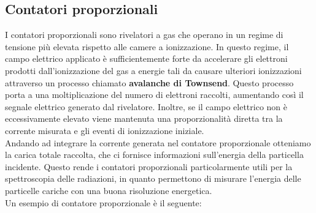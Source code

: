 \subsection{Contatori proporzionali}
I contatori proporzionali sono rivelatori a gas che operano in un regime di tensione più elevata rispetto alle camere a ionizzazione. In questo regime, il campo elettrico applicato è sufficientemente forte da accelerare gli elettroni prodotti dall'ionizzazione del gas a energie tali da causare ulteriori ionizzazioni attraverso un processo chiamato \textbf{avalanche di Townsend}. Questo processo porta a una moltiplicazione del numero di elettroni raccolti, aumentando così il segnale elettrico generato dal rivelatore. Inoltre, se il campo elettrico non è eccessivamente elevato viene mantenuta una proporzionalità diretta tra la corrente misurata e gli eventi di ionizzazione iniziale.\\
Andando ad integrare la corrente generata nel contatore proporzionale otteniamo la carica totale raccolta, che ci fornisce informazioni sull'energia della particella incidente. Questo rende i contatori proporzionali particolarmente utili per la spettroscopia delle radiazioni, in quanto permettono di misurare l'energia delle particelle cariche con una buona risoluzione energetica.\\
Un esempio di contatore proporzionale è il seguente:


